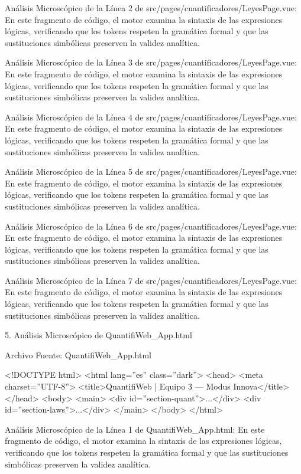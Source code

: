 \documentclass[11pt,a4paper]{article}
\begin{document}
Análisis Microscópico de la Línea 2 de
src/pages/cuantificadores/LeyesPage.vue: En este fragmento de código, el
motor examina la sintaxis de las expresiones lógicas, verificando que
los tokens respeten la gramática formal y que las sustituciones
simbólicas preserven la validez analítica.

Análisis Microscópico de la Línea 3 de
src/pages/cuantificadores/LeyesPage.vue: En este fragmento de código, el
motor examina la sintaxis de las expresiones lógicas, verificando que
los tokens respeten la gramática formal y que las sustituciones
simbólicas preserven la validez analítica.

Análisis Microscópico de la Línea 4 de
src/pages/cuantificadores/LeyesPage.vue: En este fragmento de código, el
motor examina la sintaxis de las expresiones lógicas, verificando que
los tokens respeten la gramática formal y que las sustituciones
simbólicas preserven la validez analítica.

Análisis Microscópico de la Línea 5 de
src/pages/cuantificadores/LeyesPage.vue: En este fragmento de código, el
motor examina la sintaxis de las expresiones lógicas, verificando que
los tokens respeten la gramática formal y que las sustituciones
simbólicas preserven la validez analítica.

Análisis Microscópico de la Línea 6 de
src/pages/cuantificadores/LeyesPage.vue: En este fragmento de código, el
motor examina la sintaxis de las expresiones lógicas, verificando que
los tokens respeten la gramática formal y que las sustituciones
simbólicas preserven la validez analítica.

Análisis Microscópico de la Línea 7 de
src/pages/cuantificadores/LeyesPage.vue: En este fragmento de código, el
motor examina la sintaxis de las expresiones lógicas, verificando que
los tokens respeten la gramática formal y que las sustituciones
simbólicas preserven la validez analítica.

5. Análisis Microscópico de QuantifiWeb\_App.html

 Archivo Fuente: QuantifiWeb\_App.html

\medskip\hrulefill\medskip
<!DOCTYPE html>
<html lang=''es'' class=''dark''>
<head>
<meta charset=''UTF-8''>
<title>QuantifiWeb | Equipo 3 --- Modus Innova</title>
</head>
<body>
<main>
<div id=''section-quant''>...</div>
<div id=''section-laws''>...</div>
</main>
</body>
</html>
\medskip\hrulefill\medskip

\medskip\hrulefill\medskip

Análisis Microscópico de la Línea 1 de QuantifiWeb\_App.html: En este
fragmento de código, el motor examina la sintaxis de las expresiones
lógicas, verificando que los tokens respeten la gramática formal y que
las sustituciones simbólicas preserven la validez analítica.
\end{document}
